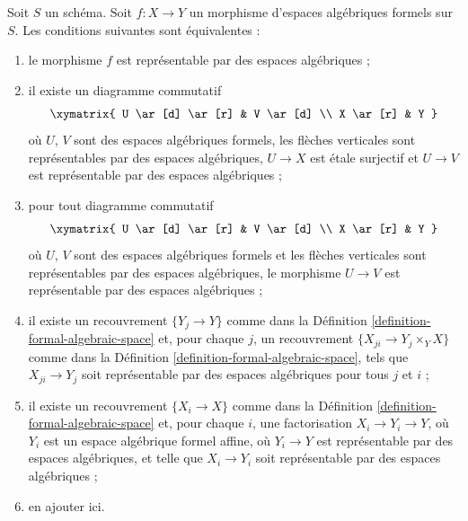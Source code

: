 \begin{lemma}
\label{lemma-representable-by-algebraic-spaces-local}
Soit $S$ un schéma. Soit $f : X \to Y$ un morphisme d'espaces algébriques
formels sur $S$. Les conditions suivantes sont équivalentes :
\begin{enumerate}
\item le morphisme $f$ est représentable par des espaces algébriques ;
\item il existe un diagramme commutatif
$$
\xymatrix{
U \ar[d] \ar[r] & V \ar[d] \\
X \ar[r] & Y
}
$$
où $U$, $V$ sont des espaces algébriques formels, les flèches verticales sont
représentables par des espaces algébriques, $U \to X$
est étale surjectif et $U \to V$ est représentable par des espaces algébriques ;
\item pour tout diagramme commutatif
$$
\xymatrix{
U \ar[d] \ar[r] & V \ar[d] \\
X \ar[r] & Y
}
$$
où $U$, $V$ sont des espaces algébriques formels et les flèches verticales sont
représentables par des espaces algébriques, le morphisme $U \to V$ est
représentable par des espaces algébriques ;
\item il existe un recouvrement $\{Y_j \to Y\}$ comme dans la
Définition \ref{definition-formal-algebraic-space}
et, pour chaque $j$, un recouvrement $\{X_{ji} \to Y_j \times_Y X\}$ comme dans la
Définition \ref{definition-formal-algebraic-space}, tels que
$X_{ji} \to Y_j$ soit représentable par des espaces algébriques pour tous $j$ et $i$ ;
\item il existe un recouvrement $\{X_i \to X\}$ comme dans la
Définition \ref{definition-formal-algebraic-space}
et, pour chaque $i$, une factorisation $X_i \to Y_i \to Y$, où $Y_i$
est un espace algébrique formel affine, où $Y_i \to Y$ est représentable
par des espaces algébriques, et telle que $X_i \to Y_i$ soit représentable par des espaces
algébriques ;
\item en ajouter ici.
\end{enumerate}
\end{lemma}

